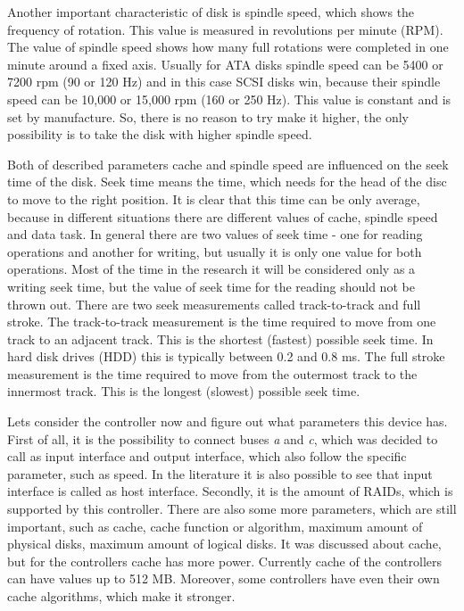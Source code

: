 Another important characteristic of disk is spindle speed, which shows the frequency of rotation. This value is measured in revolutions per minute (RPM). The value of spindle speed shows how many full rotations were completed in one minute around a fixed axis. Usually for ATA disks spindle speed can be 5400 or 7200 rpm (90 or 120 Hz) and in this case SCSI disks win, because their spindle speed can be 10,000 or 15,000 rpm (160 or 250 Hz). This value is constant and is set by manufacture. So, there is no reason to try make it higher, the only possibility is to take the disk with higher spindle speed.

Both of described parameters cache and spindle speed are influenced on the seek time of the disk. Seek time means the time, which needs for the head of the disc to move to the right position. It is clear that this time can be only average, because in different situations there are different values of cache, spindle speed and data task. In general there are two values of seek time - one for reading operations and another for writing, but usually it is only one value for both operations. Most of the time in the research it will be considered only as a writing seek time, but the value of seek time for the reading should not be thrown out. There are two seek measurements called track-to-track and full stroke. The track-to-track measurement is the time required to move from one track to an adjacent track. This is the shortest (fastest) possible seek time. In hard disk drives (HDD) this is typically between 0.2 and 0.8 ms. The full stroke measurement is the time required to move from the outermost track to the innermost track. This is the longest (slowest) possible seek time.

Lets consider the controller now and figure out what parameters this device has. First of all, it is the possibility to connect buses \emph{a} and \emph{c}, which was decided to call as input interface and output interface, which also follow the specific parameter, such as speed. In the literature it is also possible to see that input interface is called as host interface. Secondly, it is the amount of RAIDs, which is supported by this controller. There are also some more parameters, which are still important, such as cache, cache function or algorithm, maximum amount of physical disks, maximum amount of logical disks. It was discussed about cache, but for the controllers cache has more power. Currently cache of the controllers can have values up to 512 MB. Moreover, some controllers have even their own cache algorithms, which make it stronger. 

